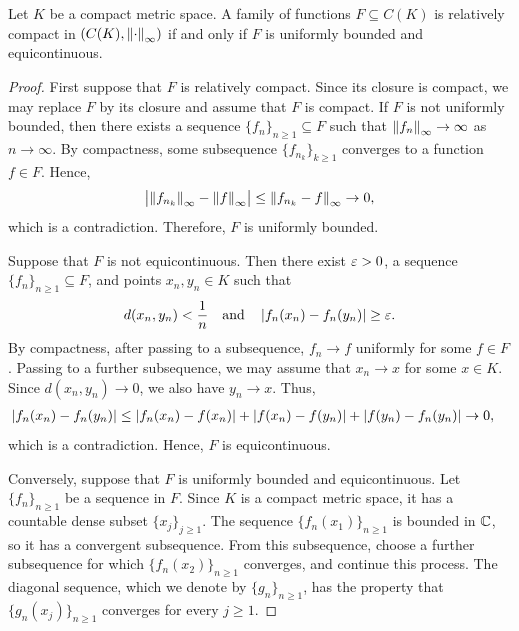 \begin{theorem}
    Let $K$ be a compact metric space. A family of functions $F \subseteq C(K)$ is relatively compact in $(C(K),\left\lVert\cdot\right\rVert_{\infty})$ if and only if $F$ is uniformly bounded and equicontinuous.    
\end{theorem}
\begin{proof}
    First suppose that $F$ is relatively compact. Since its closure is compact, we may replace $F$ by its closure and assume that $F$ is compact. If $F$ is not uniformly bounded, then there exists a sequence $\{f_{n}\}_{n \geq 1} \subseteq F$ such that $\left\lVert f_{n}\right\rVert_{\infty} \to \infty$ as $n \to \infty$. By compactness, some subsequence $\{f_{n_{k}}\}_{k \geq 1}$ converges to a function $f \in F$. Hence,
    \begin{align}
        \left| \left\lVert f_{n_{k}}\right\rVert_{\infty}-\left\lVert f\right\rVert_{\infty} \right| \leq \left\lVert f_{n_{k}}-f\right\rVert_{\infty} \to 0,
    \end{align}
    which is a contradiction. Therefore, $F$ is uniformly bounded.

    Suppose that $F$ is not equicontinuous. Then there exist $\varepsilon > 0$, a sequence $\{f_{n}\}_{n \geq 1} \subseteq F$, and points $x_{n},y_{n} \in K$ such that
    \begin{align}
        d(x_{n},y_{n}) < \frac{1}{n}
        \quad\text{and}\quad
        \left| f_{n}(x_{n})-f_{n}(y_{n}) \right| \geq \varepsilon.
    \end{align}
    By compactness, after passing to a subsequence, $f_{n} \to f$ uniformly for some $f \in F$. Passing to a further subsequence, we may assume that $x_{n} \to x$ for some $x \in K$. Since $d(x_{n},y_{n}) \to 0$, we also have $y_{n} \to x$. Thus,
    \begin{align}
        \left| f_{n}(x_{n})-f_{n}(y_{n}) \right|
        &\leq \left| f_{n}(x_{n})-f(x_{n}) \right|
        +\left| f(x_{n})-f(y_{n}) \right|
        +\left| f(y_{n})-f_{n}(y_{n}) \right|
        \to 0,
    \end{align}
    which is a contradiction. Hence, $F$ is equicontinuous.

    Conversely, suppose that $F$ is uniformly bounded and equicontinuous. Let $\{f_{n}\}_{n \geq 1}$ be a sequence in $F$. Since $K$ is a compact metric space, it has a countable dense subset $\{x_{j}\}_{j \geq 1}$. The sequence $\{f_{n}(x_{1})\}_{n \geq 1}$ is bounded in $\mathbb{C}$, so it has a convergent subsequence. From this subsequence, choose a further subsequence for which $\{f_{n}(x_{2})\}_{n \geq 1}$ converges, and continue this process. The diagonal sequence, which we denote by $\{g_{n}\}_{n \geq 1}$, has the property that $\{g_{n}(x_{j})\}_{n \geq 1}$ converges for every $j \geq 1$.


\end{proof}
